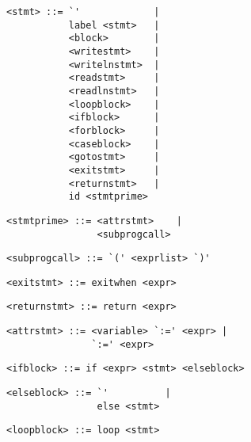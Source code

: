 \begin{footnotesize}
\begin{lstlisting}[frame=single, label={stmt}, language=pie]
<stmt> ::= `'             |
           label <stmt>   |
           <block>        |
           <writestmt>    |
           <writelnstmt>  |
           <readstmt>     |
           <readlnstmt>   |
           <loopblock>    |
           <ifblock>      |
           <forblock>     |
           <caseblock>    |
           <gotostmt>     |
           <exitstmt>     |
           <returnstmt>   |
           id <stmtprime>
\end{lstlisting}

\begin{lstlisting}[frame=single, label={stmtprime}, language=pie]
<stmtprime> ::= <attrstmt>    |
                <subprogcall>
\end{lstlisting}

\begin{lstlisting}[frame=single, label={subprogcall}, language=pie]
<subprogcall> ::= `(' <exprlist> `)'
\end{lstlisting}

\begin{lstlisting}[frame=single, label={exitstmt}, language=pie]
<exitstmt> ::= exitwhen <expr>
\end{lstlisting}

\begin{lstlisting}[frame=single, label={returnstmt}, language=pie]
<returnstmt> ::= return <expr>
\end{lstlisting}

\begin{lstlisting}[frame=single, label={attrstmt}, language=pie]
<attrstmt> ::= <variable> `:=' <expr> |
               `:=' <expr>
\end{lstlisting}

\begin{lstlisting}[frame=single, label={ifblock}, language=pie]
<ifblock> ::= if <expr> <stmt> <elseblock>
\end{lstlisting}


\begin{lstlisting}[frame=single, label={elseblock}, language=pie]
<elseblock> ::= `'          |
                else <stmt>
\end{lstlisting}

\begin{lstlisting}[frame=single, label={loopblock}, language=pie]
<loopblock> ::= loop <stmt>
\end{lstlisting}


\end{footnotesize}
